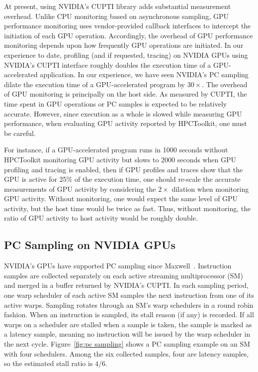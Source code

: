 At present, using NVIDIA's CUPTI library adds substantial measurement overhead.  Unlike CPU monitoring based on asynchronous sampling, GPU performance monitoring uses vendor-provided callback interfaces to intercept the initiation of each GPU operation. Accordingly,  the overhead of GPU performance monitoring depends upon how frequently GPU operations are initiated. 
In our experience to date, profiling (and if requested, tracing) on NVIDIA GPUs using NVIDIA's CUPTI interface roughly doubles the execution time of a GPU-accelerated application. In our experience, we have seen NVIDIA's PC sampling dilate the execution time of a GPU-accelerated program by $30\times$. The overhead of GPU monitoring is principally on the host side. As measured by CUPTI, the time spent in GPU operations or PC samples is expected to be relatively accurate. However, since execution as a whole is slowed while measuring GPU performance, when evaluating GPU activity reported by HPCToolkit, one must be careful.

For instance, if a GPU-accelerated program runs in 1000 seconds without HPCToolkit monitoring GPU activity but slows to 2000 seconds when GPU profiling and tracing is enabled, then if GPU profiles and traces show that the GPU is active for 25\% of the execution time, one should  re-scale the accurate measurements of GPU activity by considering the $2\times$ dilation when monitoring GPU activity. Without monitoring, one would expect the same level of GPU activity, but the host time would be twice as fast. Thus, without monitoring, the ratio of GPU activity to host activity would be roughly double.
 

\subsection{PC Sampling on NVIDIA GPUs}
\label{nvidia-pc-sampling} 

NVIDIA's GPUs have supported PC sampling since Maxwell~\cite{cuptipcsampling}.
Instruction samples are collected separately on each active streaming
multiprocessor (SM) and merged in a buffer returned by NVIDIA's CUPTI. 
In each sampling period, one warp scheduler of each active SM 
samples the next instruction from one of its active warps. Sampling rotates through
an SM's warp schedulers in a round robin fashion.
When an instruction is sampled, its stall reason (if any) is
recorded. If all warps on a scheduler are stalled when a sample is
taken, the sample is marked as a latency sample, meaning no instruction will be issued by the warp scheduler in the next cycle.
Figure~\ref{fig:pc sampling} shows a PC sampling example on an SM with four schedulers. Among the six collected samples, four are latency samples, so the estimated stall ratio is $4/6$. 

